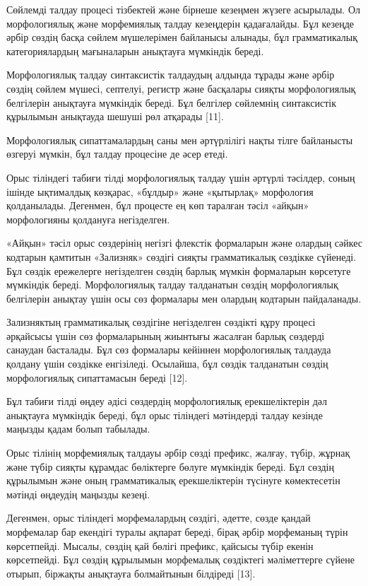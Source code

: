 \begin{multicols}{2}
Сөйлемді талдау процесі тізбектей және бірнеше кезеңмен жүзеге
асырылады. Ол морфологиялық және морфемиялық талдау кезеңдерін
қадағалайды. Бұл кезеңде әрбір сөздің басқа сөйлем мүшелерімен байланысы
алынады, бұл грамматикалық категориялардың мағыналарын анықтауға
мүмкіндік береді.

Морфологиялық талдау синтаксистік талдаудың алдында тұрады және әрбір
сөздің сөйлем мүшесі, септелуі, регистр және басқалары сияқты
морфологиялық белгілерін анықтауға мүмкіндік береді. Бұл белгілер
сөйлемнің синтаксистік құрылымын анықтауда шешуші рөл атқарады {[}11{]}.

Морфологиялық сипаттамалардың саны мен әртүрлілігі нақты тілге
байланысты өзгеруі мүмкін, бұл талдау процесіне де әсер етеді.

Орыс тіліндегі табиғи тілді морфологиялық талдау үшін әртүрлі тәсілдер,
соның ішінде ықтималдық көзқарас, «бұлдыр» және «қытырлақ» морфология
қолданылады. Дегенмен, бұл процесте ең көп таралған тәсіл «айқын»
морфологияны қолдануға негізделген.

«Айқын» тәсіл орыс сөздерінің негізгі флекстік формаларын және олардың
сәйкес кодтарын қамтитын «Зализняк» сөздігі сияқты грамматикалық
сөздікке сүйенеді. Бұл сөздік ережелерге негізделген сөздің барлық
мүмкін формаларын көрсетуге мүмкіндік береді. Морфологиялық талдау
талданатын сөздің морфологиялық белгілерін анықтау үшін осы сөз
формалары мен олардың кодтарын пайдаланады.

Зализняктың грамматикалық сөздігіне негізделген сөздікті құру процесі
әрқайсысы үшін сөз формаларының жиынтығы жасалған барлық сөздерді
санаудан басталады. Бұл сөз формалары кейіннен морфологиялық талдауда
қолдану үшін сөздікке енгізіледі. Осылайша, бұл сөздік талданатын сөздің
морфологиялық сипаттамасын береді {[}12{]}.

Бұл табиғи тілді өңдеу әдісі сөздердің морфологиялық ерекшеліктерін дәл
анықтауға мүмкіндік береді, бұл орыс тіліндегі мәтіндерді талдау кезінде
маңызды қадам болып табылады.

Орыс тілінің морфемиялық талдауы әрбір сөзді префикс, жалғау, түбір,
жұрнақ және түбір сияқты құрамдас бөліктерге бөлуге мүмкіндік береді.
Бұл сөздің құрылымын және оның грамматикалық ерекшеліктерін түсінуге
көмектесетін мәтінді өңдеудің маңызды кезеңі.

Дегенмен, орыс тіліндегі морфемалардың сөздігі, әдетте, сөзде қандай
морфемалар бар екендігі туралы ақпарат береді, бірақ әрбір морфеманың
түрін көрсетпейді. Мысалы, сөздің қай бөлігі префикс, қайсысы түбір
екенін көрсетпейді. Бұл сөздің құрылымын морфемалық сөздіктегі
мәліметтерге сүйене отырып, біржақты анықтауға болмайтынын білдіреді
{[}13{]}.


\end{multicols}

